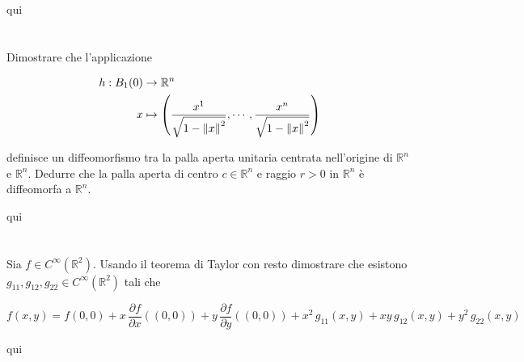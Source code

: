 qui

\section{}\label{es1-4}

\begin{tcolorbox}
	Dimostrare che l'applicazione
	
	\begin{align}
		\begin{split}
			h : B_{1} (0) &\to \mathbb{R}^{n}\\
			x &\mapsto \left( \dfrac{x^{1}}{\sqrt{1 - \norm{x}^{2}}}, \cdots, \dfrac{x^{n}}{\sqrt{1 - \norm{x}^{2}}} \right)
		\end{split}	
	\end{align}
	
	definisce un diffeomorfismo tra la palla aperta unitaria centrata nell'origine di $ \mathbb{R}^{n} $ e $ \mathbb{R}^{n} $. Dedurre che la palla aperta di centro $ c \in \mathbb{R}^{n} $ e raggio $ r>0 $ in $ \mathbb{R}^{n} $ è diffeomorfa a $ \mathbb{R}^{n} $.
\end{tcolorbox}

qui

\section{}\label{es1-5}

\begin{tcolorbox}
	Sia $ f \in C^{\infty}(\mathbb{R}^{2}) $. Usando il teorema di Taylor con resto dimostrare che esistono $ g_{11},g_{12},g_{22} \in C^{\infty}(\mathbb{R}^{2}) $ tali che
	
	\begin{equation}
		f(x,y) = f(0,0) + x \, \dfrac{\partial f}{\partial x} ((0,0)) + y \, \dfrac{\partial f}{\partial y} ((0,0)) + x^{2} \, g_{11}(x,y) + xy \, g_{12}(x,y) + y^{2} \, g_{22}(x,y)
	\end{equation}
\end{tcolorbox}

qui

\section{}\label{es1-6}

